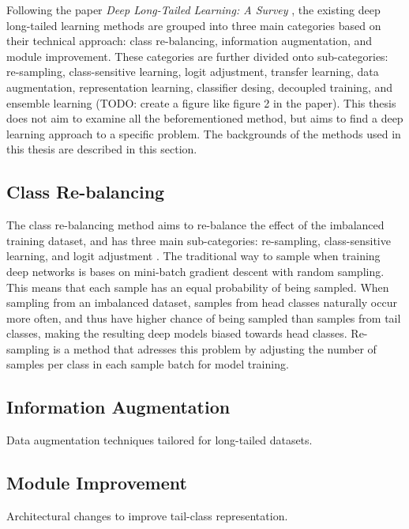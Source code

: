 Following the paper \textit{Deep Long-Tailed Learning: A Survey} \cite{zhang2023deep}, the existing deep long-tailed learning methods are grouped into three main categories based on their technical approach: class re-balancing, information augmentation, and module improvement. These categories are further divided onto sub-categories: re-sampling, class-sensitive learning, logit adjustment, transfer learning, data augmentation, representation learning, classifier desing, decoupled training, and ensemble learning (TODO: create a figure like figure 2 in the paper). This thesis does not aim to examine all the beforementioned method, but aims to find a deep learning approach to a specific problem. The backgrounds of the methods used in this thesis are described in this section.

\subsection{Class Re-balancing}
The class re-balancing method aims to re-balance the effect of the imbalanced training dataset, and has three main sub-categories: re-sampling, class-sensitive learning, and logit adjustment \cite{zhang2023deep}. The traditional way to sample when training deep networks is bases on mini-batch gradient descent with random sampling. This means that each sample has an equal probability of being sampled. When sampling from an imbalanced dataset, samples from head classes naturally occur more often, and thus have higher chance of being sampled than samples from tail classes, making the resulting deep models biased towards head classes. Re-sampling is a method that adresses this problem by adjusting the number of samples per class in each sample batch for model training. 



\subsection{Information Augmentation}
Data augmentation techniques tailored for long-tailed datasets.

\subsection{Module Improvement}
Architectural changes to improve tail-class representation.